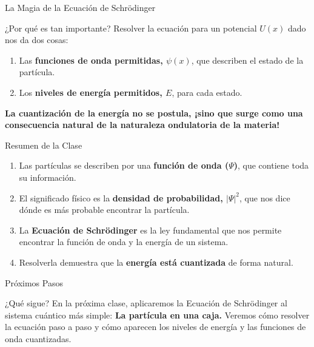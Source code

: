 \documentclass{beamer}
\begin{document}
\begin{frame}{La Magia de la Ecuación de Schrödinger}
  \begin{block}{¿Por qué es tan importante?}
    Resolver la ecuación para un potencial $U(x)$ dado nos da dos cosas:
    \begin{enumerate}
      \item Las \textbf{funciones de onda permitidas, $\psi(x)$}, que describen el estado de la partícula.
      \item Los \textbf{niveles de energía permitidos, $E$}, para cada estado.
    \end{enumerate}
  \end{block}
  \pause
  \begin{alertblock}{}
    \centering
    \textbf{La cuantización de la energía no se postula, ¡sino que surge como una consecuencia natural de la naturaleza ondulatoria de la materia!}
  \end{alertblock}
\end{frame}

\begin{frame}{Resumen de la Clase}
  \begin{enumerate}
    \item Las partículas se describen por una \textbf{función de onda ($\Psi$)}, que contiene toda su información.
    \item El significado físico es la \textbf{densidad de probabilidad, $|\Psi|^2$}, que nos dice dónde es más probable encontrar la partícula.
    \item La \textbf{Ecuación de Schrödinger} es la ley fundamental que nos permite encontrar la función de onda y la energía de un sistema.
    \item Resolverla demuestra que la \textbf{energía está cuantizada} de forma natural.
  \end{enumerate}
\end{frame}

\begin{frame}{Próximos Pasos}
  \begin{block}{¿Qué sigue?}
    En la próxima clase, aplicaremos la Ecuación de Schrödinger al sistema cuántico más simple:
    \vspace{1em}
    \centering\textbf{\Large La partícula en una caja.}
    \vspace{1em}
    Veremos cómo resolver la ecuación paso a paso y cómo aparecen los niveles de energía y las funciones de onda cuantizadas.
  \end{block}
\end{frame}
\end{document}
